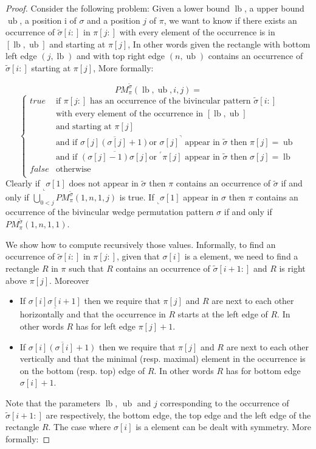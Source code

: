 \documentclass[a4paper]{llncs}
\newcommand{\RLMin}{\text{RLMin}\xspace}
\newcommand{\RLMax}{\text{RLMax}\xspace}
\newcommand{\ptext}{\pi}
\newcommand{\PM}{PM}
\DeclareMathOperator{\lb}{lb}
\DeclareMathOperator{\ub}{ub}
\begin{document}
\begin{proof}
Consider the following problem:
Given a lower bound $\lb$, a upper bound $\ub$, a position i of $\sigma$
and a position $j$ of $\pi$, we want to know if
there exists an occurrence of $\widetilde{\sigma}[i:]$ in $\ptext[j:]$
with every element of the occurrence is in $[\lb,\ub]$
and starting at $\pi[j]$,
In other words given the rectangle with bottom left edge
$(j,\lb)$ and with top right edge $(n,\ub)$
contains an occurrence of $\widetilde{\sigma}[i:]$
starting at $\pi[j]$,
More formally:

$$
\PM^{\widetilde{\sigma}}_{\ptext}(\lb,\ub,i,j)=
$$
$$
\begin{cases}
	true 	& \text{if $\ptext[j:]$ has an occurrence of the bivincular pattern $\widetilde{\sigma}[i:]$ }\\
			& \text{with every element of the occurrence in $[\lb,\ub]$}\\
			& \text{and starting at $\pi[j]$}\\
			& \text{and if $\overline{\sigma[j](\sigma[j]+1)}$
			 or $\sigma[j]^\urcorner$ appear in $\widetilde{\sigma}$ then $\pi[j]=\ub$} \\
			& \text{and if $\overline{(\sigma[j]-1)\sigma[j]}$
			 or $^\ulcorner{\pi[j]}$ appear in $\widetilde{\sigma}$ then $\sigma[j]=\lb$} \\
	false 	& \text{otherwise}\\
\end{cases}
$$
Clearly if $_\llcorner{\sigma[1]}$ does not appear in $\widetilde{\sigma}$
then $\pi$ contains an occurrence of $\widetilde{\sigma}$
if and only if $\bigcup_{0<j} \PM^{\widetilde{\sigma}}_{\ptext}(1,n,1,j)$ is true.
If $_\llcorner{\sigma[1]}$ appear in $\sigma$ then
$\pi$ contains an occurrence of
the bivincular wedge permutation pattern $\sigma$
if and only if $\PM^{\widetilde{\sigma}}_{\ptext}(1,n,1,1)$.

We show how to compute recursively those values.
Informally, to find an occurrence of $\widetilde{\sigma}[i:]$ in $\pi[j:]$,
given that $\sigma[i]$ is a \RLMin element,
we need to find a rectangle $R$ in $\pi$
such that $R$ contains an occurrence of $\widetilde{\sigma}[i+1:]$
and $R$ is right above $\pi[j]$.
Moreover
\begin{itemize}
\item If $\underline{\sigma[i]\sigma[i+1]}$ then
we require that $\pi[j]$ and $R$ are next to each other horizontally
and that the occurrence in $R$ starts at the left edge of $R$.
In other words $R$ has for left edge $\pi[j]+1$.
\item If $\overline{\sigma[i](\sigma[i]+1)}$ then
we require that $\pi[j]$ and $R$ are next to each other vertically
and that the minimal (resp. maximal) element in the occurrence
is on the bottom (resp. top) edge of $R$.
In other words $R$ has for bottom edge $\sigma[i]+1$.
\end{itemize}
Note that the parameters $\lb$, $\ub$ and $j$ corresponding
to the occurrence of $\widetilde{\sigma}[i+1:]$ are respectively,
the bottom edge, the top edge and the left edge of the rectangle $R$.
The case where $\sigma[i]$ is a \RLMax element can be dealt with symmetry.
More formally:


\end{proof}
\end{document}
